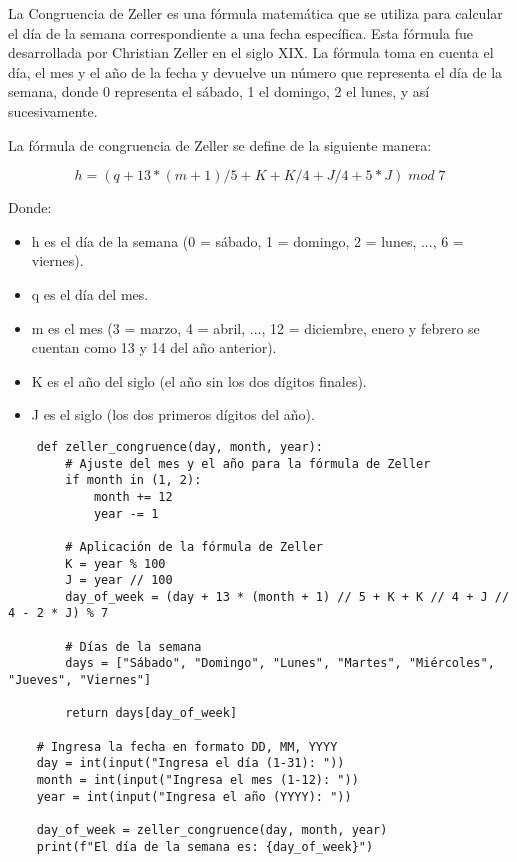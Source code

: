\noindent La Congruencia de Zeller es una fórmula matemática que se utiliza para calcular el día de la semana correspondiente a una fecha específica. Esta fórmula fue desarrollada por Christian Zeller en el siglo XIX. La fórmula toma en cuenta el día, el mes y el año de la fecha y devuelve un número que representa el día de la semana, donde 0 representa el sábado, 1 el domingo, 2 el lunes, y así sucesivamente.

\noindent La fórmula de congruencia de Zeller se define de la siguiente manera:

\begin{equation*}
	h = (q + 13*(m+1)/5 + K + K/4 + J/4 + 5*J) \; mod \; 7
\end{equation*}


\noindent Donde:

\begin{itemize}
	\item h es el día de la semana (0 = sábado, 1 = domingo, 2 = lunes, ..., 6 = viernes).
	
	\item q es el día del mes.
	
	\item m es el mes (3 = marzo, 4 = abril, ..., 12 = diciembre, enero y febrero se cuentan como 13 y 14 del año anterior).
	
	\item K es el año del siglo (el año sin los dos dígitos finales).
	
	\item J es el siglo (los dos primeros dígitos del año).
\end{itemize}

\begin{lstlisting}
	def zeller_congruence(day, month, year):
		# Ajuste del mes y el año para la fórmula de Zeller
		if month in (1, 2):
			month += 12
			year -= 1
	
		# Aplicación de la fórmula de Zeller
		K = year % 100
		J = year // 100
		day_of_week = (day + 13 * (month + 1) // 5 + K + K // 4 + J // 4 - 2 * J) % 7
	
		# Días de la semana
		days = ["Sábado", "Domingo", "Lunes", "Martes", "Miércoles", "Jueves", "Viernes"]
	
		return days[day_of_week]
	
	# Ingresa la fecha en formato DD, MM, YYYY
	day = int(input("Ingresa el día (1-31): "))
	month = int(input("Ingresa el mes (1-12): "))
	year = int(input("Ingresa el año (YYYY): "))
	
	day_of_week = zeller_congruence(day, month, year)
	print(f"El día de la semana es: {day_of_week}")
	
	
\end{lstlisting}